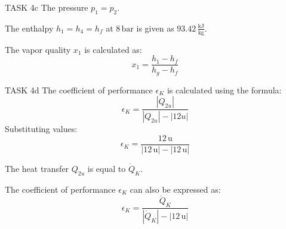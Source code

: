 TASK 4c  
The pressure \( p_1 = p_2 \).  

The enthalpy \( h_1 = h_4 = h_f \) at \( 8 \, \text{bar} \) is given as \( 93.42 \, \frac{\text{kJ}}{\text{kg}} \).  

The vapor quality \( x_1 \) is calculated as:  
\[
x_1 = \frac{h_1 - h_f}{h_g - h_f}
\]  

TASK 4d  
The coefficient of performance \( \epsilon_K \) is calculated using the formula:  
\[
\epsilon_K = \frac{|Q_{2u}|}{|Q_{2u}| - |12u|}
\]  
Substituting values:  
\[
\epsilon_K = \frac{12 \, \text{u}}{|12 \, \text{u}| - |12 \, \text{u}|}
\]  

The heat transfer \( Q_{2u} \) is equal to \( \dot{Q}_K \).  

The coefficient of performance \( \epsilon_K \) can also be expressed as:  
\[
\epsilon_K = \frac{\dot{Q}_K}{|\dot{Q}_K| - |12 \, \text{u}|}
\]  